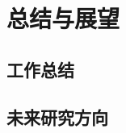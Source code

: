 \chapter{总结与展望}
\label{ch:conclusion}

\section{工作总结}
\label{sec:summary}

\section{未来研究方向}
\label{sec:future}
